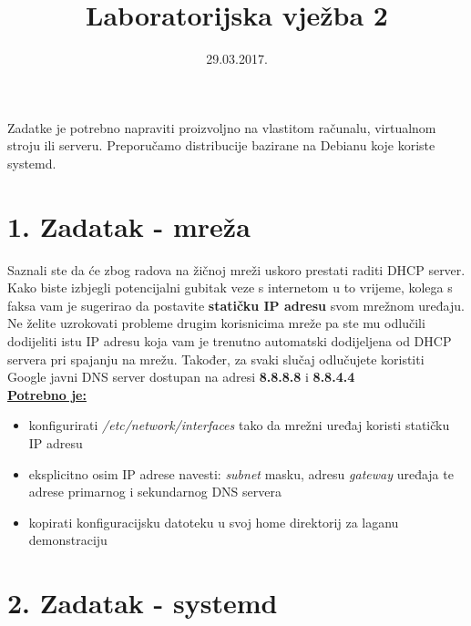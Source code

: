 \documentclass[12pt,a4paper]{article}
\begin{document}
	\title{Laboratorijska vježba 2}
	\date{\vspace{-5ex} 29.03.2017.}
	\maketitle

Zadatke je potrebno napraviti proizvoljno na vlastitom računalu, virtualnom stroju ili serveru. Preporučamo distribucije bazirane na Debianu koje koriste systemd.

\section*{1. Zadatak - mreža}

Saznali ste da će zbog radova na žičnoj mreži uskoro prestati raditi DHCP server.
Kako biste izbjegli potencijalni gubitak veze s internetom u to vrijeme, kolega s faksa vam je sugerirao da postavite \textbf{statičku IP adresu} svom mrežnom uređaju.
Ne želite uzrokovati probleme drugim korisnicima mreže pa ste mu odlučili dodijeliti
istu IP adresu koja vam je trenutno automatski dodijeljena od DHCP servera pri spajanju na mrežu.
Također, za svaki slučaj odlučujete koristiti Google javni DNS server dostupan na adresi \textbf{8.8.8.8} i \textbf{8.8.4.4} \\

\underline{\textbf{Potrebno je:}}
\begin{itemize}
	\item konfigurirati \textit{/etc/network/interfaces} tako da mrežni uređaj koristi statičku IP adresu
  \item eksplicitno osim IP adrese navesti: \textit{subnet} masku, adresu \textit{gateway} uređaja te adrese primarnog i sekundarnog DNS servera
  \item kopirati konfiguracijsku datoteku u svoj home direktorij za laganu demonstraciju
\end{itemize}


\newpage


\section*{2. Zadatak - systemd}
\end{document}
